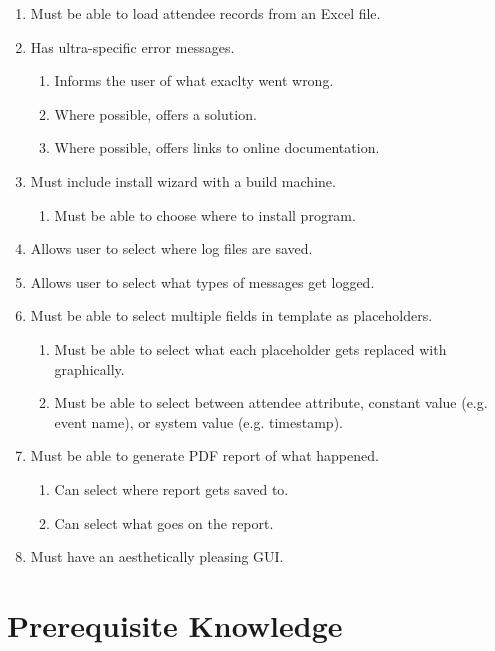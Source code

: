 \documentclass[11pt]{article}
\begin{document}
\begin{enumerate}
    \item Must be able to load attendee records from an Excel file.
    \item Has ultra-specific error messages.
    \begin{enumerate}
        \item Informs the user of what exaclty went wrong.
        \item Where possible, offers a solution.
        \item Where possible, offers links to online documentation.
    \end{enumerate}
    \item Must include install wizard with a build machine.
    \begin{enumerate}
        \item Must be able to choose where to install program.
    \end{enumerate}
    \item Allows user to select where log files are saved.
    \item Allows user to select what types of messages get logged.
    \item Must be able to select multiple fields in template as placeholders.
    \begin{enumerate}
        \item Must be able to select what each placeholder gets replaced with graphically.
        \item Must be able to select between attendee attribute, constant value (e.g. event name), or system value (e.g. timestamp).
    \end{enumerate}
    \item Must be able to generate PDF report of what happened.
    \begin{enumerate}
        \item Can select where report gets saved to.
        \item Can select what goes on the report.
    \end{enumerate}
    \item Must have an aesthetically pleasing GUI.
\end{enumerate}

\newpage

\section{Prerequisite Knowledge}
\end{document}
